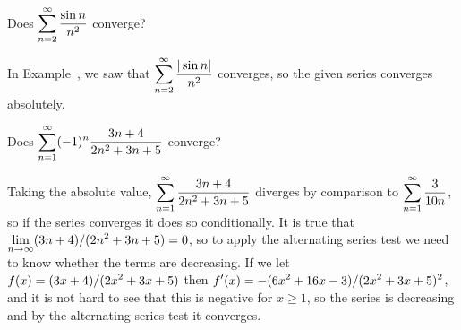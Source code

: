 \begin{example}
  Does $\displaystyle\sum_{n=2}^\infty {\sin n\over n^2}$ converge?
\end{example}
\begin{solution}
  In Example~, we saw that
  $\displaystyle\sum_{n=2}^\infty {|\sin n|\over n^2}$ converges, so the given
  series converges absolutely.
\end{solution}

\begin{example}
Does $\displaystyle\sum_{n=1}^\infty (-1)^{n}{3n+4\over 2n^2+3n+5}$ converge?
\end{example}
\begin{solution}
Taking the absolute value, $\displaystyle\sum_{n=1}^\infty {3n+4\over 2n^2+3n+5}$
diverges by comparison to $\displaystyle\sum_{n=1}^\infty {3\over 10n}$, so if
the series converges it does so conditionally. It is true that
$\displaystyle\lim_{n\to\infty}(3n+4)/(2n^2+3n+5)=0$, so to apply the
alternating series test we need to know whether the terms are
decreasing.
If we let $\displaystyle f(x)=(3x+4)/(2x^2+3x+5)$ then 
$\displaystyle f'(x)=-(6x^2+16x-3)/(2x^2+3x+5)^2$, and it is not hard to see that
this is negative for $x\ge1$, so the series is decreasing and by the
alternating series test it converges.
\end{solution}

